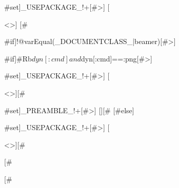 {#set]_USEPACKAGE_!+[#>] [\usepackage{graphicx}<\n>] [#}
{#if]!@{varEqual(_DOCUMENTCLASS_|beamer)}[#>]
  {#if]#Rb{$dyn[:cmd] and $dyn[:cmd]==:png}[#>]
    {#set]_USEPACKAGE_!+[#>] [\usepackage[noheadfoot,top=0in,bottom=0in,left=0in,right=0in,mag=1200]{geometry}<\n>][#}
    {#set]_PREAMBLE_!+[#>] [\pagestyle{empty}][#}
  [#else]
    {#set]_USEPACKAGE_!+[#>] [\usepackage[a4paper,pdftex=true]{geometry}<\n>][#}
  [#}
[#}
